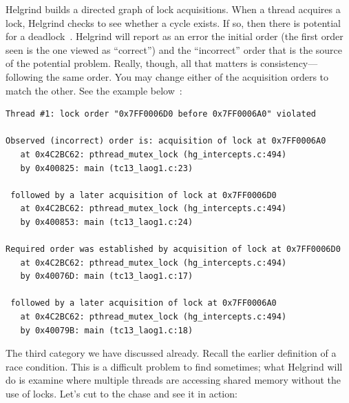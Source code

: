 \documentclass[a4paper]{report}
\begin{document}
Helgrind builds a directed graph of lock acquisitions. When a thread acquires a lock, Helgrind checks to see whether a cycle exists. If so, then there is potential for a deadlock~\cite{helgrind}. Helgrind will report as an error the initial order (the first order seen is the one viewed as ``correct'') and the ``incorrect'' order that is the source of the potential problem. Really, though, all that matters is consistency---following the same order. You may change either of the acquisition orders to match the other. See the example below~\cite{helgrind}:

\begin{verbatim}
Thread #1: lock order "0x7FF0006D0 before 0x7FF0006A0" violated

Observed (incorrect) order is: acquisition of lock at 0x7FF0006A0
   at 0x4C2BC62: pthread_mutex_lock (hg_intercepts.c:494)
   by 0x400825: main (tc13_laog1.c:23)

 followed by a later acquisition of lock at 0x7FF0006D0
   at 0x4C2BC62: pthread_mutex_lock (hg_intercepts.c:494)
   by 0x400853: main (tc13_laog1.c:24)

Required order was established by acquisition of lock at 0x7FF0006D0
   at 0x4C2BC62: pthread_mutex_lock (hg_intercepts.c:494)
   by 0x40076D: main (tc13_laog1.c:17)

 followed by a later acquisition of lock at 0x7FF0006A0
   at 0x4C2BC62: pthread_mutex_lock (hg_intercepts.c:494)
   by 0x40079B: main (tc13_laog1.c:18)
\end{verbatim}

The third category we have discussed already. Recall the earlier definition of a race condition. This is a difficult problem to find sometimes; what Helgrind will do is examine where multiple threads are accessing shared memory without the use of locks. Let's cut to the chase and see it in action:
\end{document}
